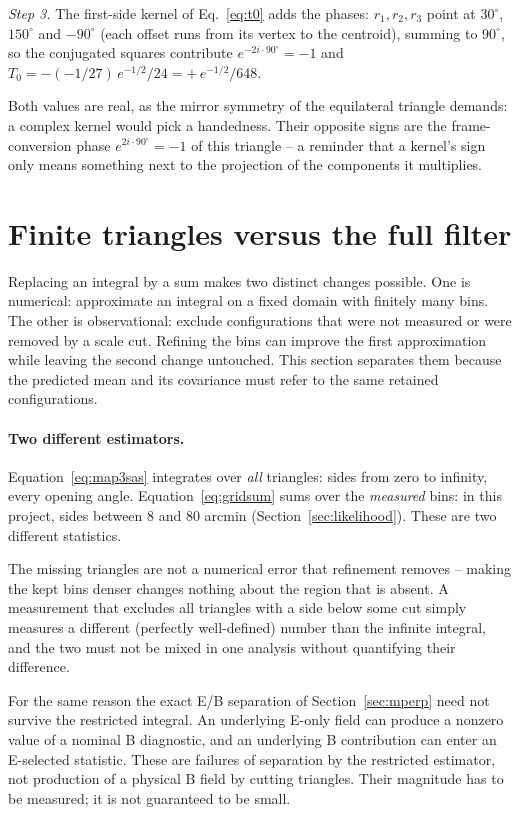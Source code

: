 \documentclass[11pt]{article}
\numberwithin{equation}{section}
\begin{document}
\emph{Step 3.}  The first-side kernel of Eq.~\eqref{eq:t0} adds the
phases: $r_1, r_2, r_3$ point at $30^\circ$, $150^\circ$ and
$-90^\circ$ (each offset runs from its vertex to the centroid),
summing to $90^\circ$, so the conjugated squares contribute
$e^{-2i\cdot 90^\circ} = -1$ and
$T_0 = -(-1/27)\, e^{-1/2}/24 = +\,e^{-1/2}/648$.

Both values are real, as the mirror symmetry of the equilateral
triangle demands: a complex kernel would pick a handedness.  Their
opposite signs are the frame-conversion phase
$e^{2i\cdot 90^\circ} = -1$ of this triangle -- a reminder that a
kernel's sign only means something next to the projection of the
components it multiplies.
\section{Finite triangles versus the full filter}
\label{sec:finite}

Replacing an integral by a sum makes two distinct changes possible.
One is numerical: approximate an integral on a fixed domain with finitely
many bins. The other is observational: exclude configurations that were
not measured or were removed by a scale cut. Refining the bins can improve
the first approximation while leaving the second change untouched. This
section separates them because the predicted mean and its covariance
must refer to the same retained configurations.

\paragraph{Two different estimators.}
Equation~\eqref{eq:map3sas} integrates over \emph{all} triangles:
sides from zero to infinity, every opening angle.
Equation~\eqref{eq:gridsum} sums over the \emph{measured} bins: in
this project, sides between $8$ and $80$ arcmin
(Section~\ref{sec:likelihood}).  These are two different
statistics.

The missing triangles are not a numerical error that refinement
removes -- making the kept bins denser changes nothing about the
region that is absent.  A measurement that excludes all triangles
with a side below some cut simply measures a different (perfectly
well-defined) number than the infinite integral, and the two must
not be mixed in one analysis without quantifying their difference.

For the same reason the exact E/B separation of
Section~\ref{sec:mperp} need not survive the restricted integral.
An underlying E-only field can produce a nonzero value of a nominal
B diagnostic, and an underlying B contribution can enter an
E-selected statistic. These are failures of separation by the restricted
estimator, not production of a physical B field by cutting triangles.
Their magnitude has to be measured; it is not guaranteed to be small.
\end{document}
